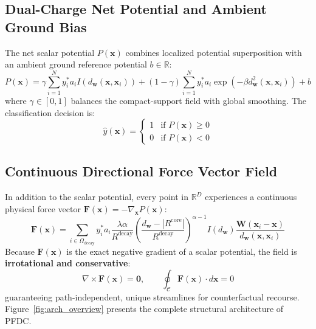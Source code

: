 \documentclass[preprint,review,12pt]{elsarticle}
\begin{document}
\subsection{Dual-Charge Net Potential and Ambient Ground Bias}
The net scalar potential $P(\mathbf{x})$ combines localized potential superposition with an ambient ground reference potential $b \in \mathbb{R}$:
\begin{equation}
P(\mathbf{x}) = \gamma \sum_{i=1}^{N} y_i^* a_i I(d_{\mathbf{w}}(\mathbf{x}, \mathbf{x}_i)) + (1 - \gamma) \sum_{i=1}^{N} y_i^* a_i \exp\left(-\beta d_{\mathbf{w}}^2(\mathbf{x}, \mathbf{x}_i)\right) + b
\end{equation}
where $\gamma \in [0, 1]$ balances the compact-support field with global smoothing. The classification decision is:
\begin{equation}
\hat{y}(\mathbf{x}) = \begin{cases} 1 & \text{if } P(\mathbf{x}) \ge 0 \\ 0 & \text{if } P(\mathbf{x}) < 0 \end{cases}
\end{equation}

\subsection{Continuous Directional Force Vector Field}
In addition to the scalar potential, every point in $\mathbb{R}^D$ experiences a continuous physical force vector $\mathbf{F}(\mathbf{x}) = -\nabla_{\mathbf{x}} P(\mathbf{x})$:
\begin{equation}
\mathbf{F}(\mathbf{x}) = \sum_{i \in \Omega_{\mathrm{decay}}} y_i^* a_i \frac{\lambda \alpha}{R^{\mathrm{decay}}} \left(\frac{d_{\mathbf{w}} - |R^{\mathrm{core}}|}{R^{\mathrm{decay}}}\right)^{\!\alpha - 1} I(d_{\mathbf{w}}) \frac{\mathbf{W}(\mathbf{x}_i - \mathbf{x})}{d_{\mathbf{w}}(\mathbf{x}, \mathbf{x}_i)}
\end{equation}
Because $\mathbf{F}(\mathbf{x})$ is the exact negative gradient of a scalar potential, the field is \textbf{irrotational and conservative}:
\begin{equation}
\nabla \times \mathbf{F}(\mathbf{x}) = \mathbf{0}, \qquad \oint_{\mathcal{C}} \mathbf{F}(\mathbf{x}) \cdot d\mathbf{x} = 0
\end{equation}
guaranteeing path-independent, unique streamlines for counterfactual recourse. Figure~\ref{fig:arch_overview} presents the complete structural architecture of PFDC.
\end{document}
